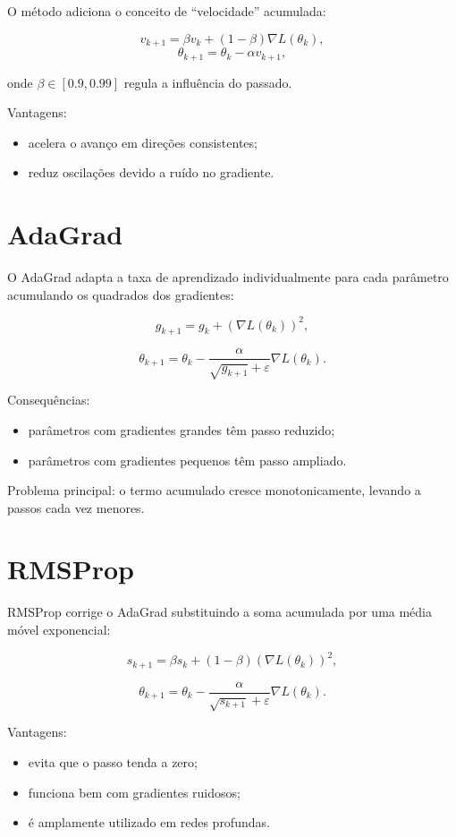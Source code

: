 \documentclass[9pt,a4paper]{extarticle}
\begin{document}
O método adiciona o conceito de ``velocidade'' acumulada:

\[
v_{k+1} = \beta v_k + (1-\beta)\nabla L(\theta_k),
\]
\[
\theta_{k+1} = \theta_k - \alpha v_{k+1},
\]

onde $\beta \in [0.9,0.99]$ regula a influência do passado.

Vantagens:
\begin{itemize}
    \item acelera o avanço em direções consistentes;
    \item reduz oscilações devido a ruído no gradiente.
\end{itemize}

\section{AdaGrad}

O AdaGrad adapta a taxa de aprendizado individualmente para cada parâmetro acumulando os quadrados dos gradientes:

\[
g_{k+1} = g_k + \left(\nabla L(\theta_k)\right)^2,
\]

\[
\theta_{k+1} = \theta_k - \frac{\alpha}{\sqrt{g_{k+1}} + \varepsilon} \nabla L(\theta_k).
\]

Consequências:
\begin{itemize}
    \item parâmetros com gradientes grandes têm passo reduzido;
    \item parâmetros com gradientes pequenos têm passo ampliado.
\end{itemize}

Problema principal: o termo acumulado cresce monotonicamente, levando a passos cada vez menores.

\section{RMSProp}

RMSProp corrige o AdaGrad substituindo a soma acumulada por uma média móvel exponencial:

\[
s_{k+1} = \beta s_k + (1-\beta)(\nabla L(\theta_k))^2,
\]

\[
\theta_{k+1} = \theta_k - \frac{\alpha}{\sqrt{s_{k+1}} + \varepsilon} \nabla L(\theta_k).
\]

Vantagens:
\begin{itemize}
    \item evita que o passo tenda a zero;
    \item funciona bem com gradientes ruidosos;
    \item é amplamente utilizado em redes profundas.
\end{itemize}
\end{document}
